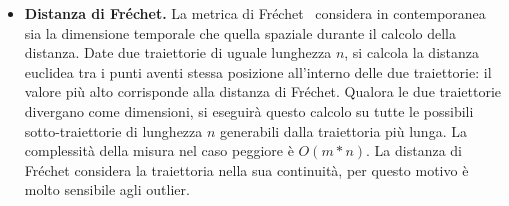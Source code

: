 \begin{itemize}
  \item \textbf{Distanza di Fréchet.}
  La metrica di Fréchet~\cite{khoshaein2013trajectory} considera in contemporanea sia la dimensione temporale
  che quella spaziale durante il calcolo della distanza.
  Date due traiettorie di uguale lunghezza \(n\), si calcola la distanza euclidea tra i punti aventi stessa posizione all'interno delle due traiettorie:
  il valore più alto corrisponde alla distanza di Fréchet.
  Qualora le due traiettorie divergano come dimensioni, si eseguirà questo calcolo su tutte le possibili sotto-traiettorie di lunghezza \(n\) generabili
  dalla traiettoria più lunga.
  La complessità della misura nel caso peggiore è \(O(m*n)\).
  La distanza di Fréchet considera la traiettoria nella sua continuità, per questo motivo è molto sensibile agli outlier.


\end{itemize}
